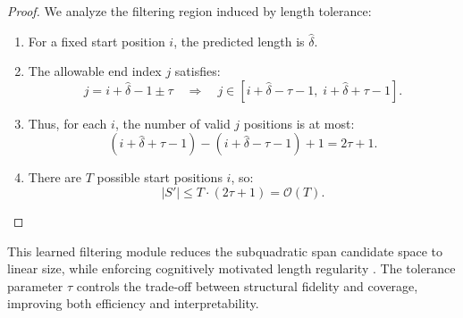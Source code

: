 \begin{proof}
	We analyze the filtering region induced by length tolerance:
	\begin{enumerate}
		\item For a fixed start position \(i\), the predicted length is \(\hat\delta\).  
		\item The allowable end index \(j\) satisfies:
		\[
		j = i + \hat\delta - 1 \pm \tau
		\quad\Rightarrow\quad
		j\in[i + \hat\delta - \tau - 1,\; i + \hat\delta + \tau - 1].
		\]
		\item Thus, for each \(i\), the number of valid \(j\) positions is at most:
		\[
		(i + \hat\delta + \tau - 1) - (i + \hat\delta - \tau - 1) + 1 = 2\tau + 1.
		\]
		\item There are \(T\) possible start positions \(i\), so:
		\[
		|S'| \le T \cdot (2\tau + 1) = \mathcal{O}(T).
		\]
	\end{enumerate}
\end{proof}

This learned filtering module reduces the subquadratic span candidate space to linear size, while enforcing cognitively motivated length regularity \cite{jackendoff1977xbar}. The tolerance parameter \(\tau\) controls the trade-off between structural fidelity and coverage, improving both efficiency and interpretability.